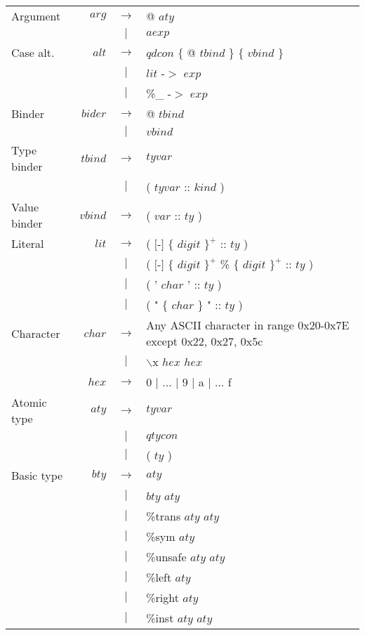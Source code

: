 \documentclass{article}
\begin{document}
\begin{small}
\begin{longtable}{ l r c l }
Argument	&
$arg$		& $ \rightarrow $	& @ $aty$										\\
		&
		& $ | $			& $aexp$										\\

Case alt.	&
$alt$		& $ \rightarrow $	& $qdcon$ $\{$ @ $tbind$ $\}$ $\{$ $vbind$ $\}$						\\
		&
		& $ | $			& $lit$ -$>$ $exp$									\\
		&
		& $ | $			& \%\_ -$>$ $exp$									\\

Binder		&
$bider$		& $ \rightarrow $	& @ $tbind$										\\
		&
		& $ | $			& $vbind$										\\

Type binder	&
$tbind$		& $ \rightarrow $	& $tyvar$										\\
		&
		& $ | $			& ( $tyvar$ :: $kind$ )									\\

Value binder	&
$vbind$		& $ \rightarrow $	& ( $var$ :: $ty$ )									\\

Literal		&
$lit$		& $ \rightarrow $	& ( $[$-$]$ $\{$ $digit$ $\}^{+}$ :: $ty$ )						\\ 
		&
		& $ | $			& ( $[$-$]$ $\{$ $digit$ $\}^{+}$ \% $\{$ $digit$ $\}^{+}$ :: $ty$ )			\\
		&
		& $ | $			& ( ' $char$ ' :: $ty$ )								\\
		&
		& $ | $			& ( " $\{$ $char$ $\}$ " :: $ty$ )							\\
Character	&
$char$		& $ \rightarrow $	& Any ASCII character in range 0x20-0x7E except 0x22, 0x27, 0x5c			\\
		&
		& $ | $			& $\backslash$x $hex$ $hex$								\\
		&
$hex$		& $ \rightarrow $	& 0 $|$ ... $|$ 9 $|$ a $|$ ... f							\\

Atomic type	&
$aty$		& $ \rightarrow $	& $tyvar$										\\
		&
		& $ | $			& $qtycon$										\\
		&
		& $ | $ 		& ( $ty$ )										\\

Basic type	&
$bty$		& $ \rightarrow $	& $aty$											\\
		&
		& $ | $			& $bty$ $aty$										\\
		&
		& $ | $			& \%trans $aty$ $aty$									\\
		&
		& $ | $			& \%sym	$aty$										\\
		&
		& $ | $			& \%unsafe $aty$ $aty$									\\
		&
		& $ | $			& \%left $aty$										\\
		&
		& $ | $			& \%right $aty$										\\
		&
		& $ | $			& \%inst $aty$ $aty$									\\


\end{longtable}
\end{small}
\end{document}
